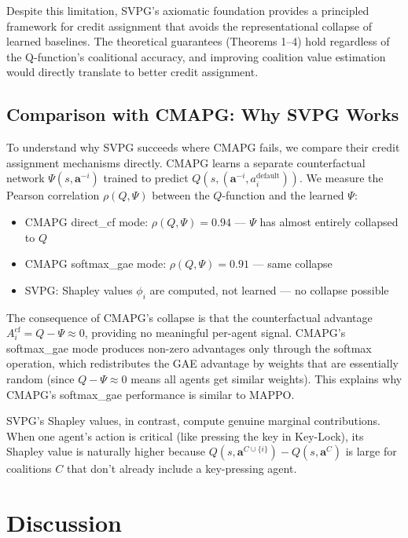 \documentclass[11pt,a4paper]{article}
\begin{document}
Despite this limitation, SVPG's axiomatic foundation provides a principled framework for credit assignment that avoids the representational collapse of learned baselines. The theoretical guarantees (Theorems 1--4) hold regardless of the Q-function's coalitional accuracy, and improving coalition value estimation would directly translate to better credit assignment.

\subsection{Comparison with CMAPG: Why SVPG Works}

To understand why SVPG succeeds where CMAPG fails, we compare their credit assignment mechanisms directly. CMAPG learns a separate counterfactual network $\Psi(s, \mathbf{a}^{-i})$ trained to predict $Q(s, (\mathbf{a}^{-i}, a_i^{\text{default}}))$. We measure the Pearson correlation $\rho(Q, \Psi)$ between the $Q$-function and the learned $\Psi$:

\begin{itemize}[leftmargin=*]
    \item CMAPG direct\_cf mode: $\rho(Q, \Psi) = 0.94$ --- $\Psi$ has almost entirely collapsed to $Q$
    \item CMAPG softmax\_gae mode: $\rho(Q, \Psi) = 0.91$ --- same collapse
    \item SVPG: Shapley values $\phi_i$ are computed, not learned --- no collapse possible
\end{itemize}

The consequence of CMAPG's collapse is that the counterfactual advantage $A_i^{\text{cf}} = Q - \Psi \approx 0$, providing no meaningful per-agent signal. CMAPG's softmax\_gae mode produces non-zero advantages only through the softmax operation, which redistributes the GAE advantage by weights that are essentially random (since $Q - \Psi \approx 0$ means all agents get similar weights). This explains why CMAPG's softmax\_gae performance is similar to MAPPO.

SVPG's Shapley values, in contrast, compute genuine marginal contributions. When one agent's action is critical (like pressing the key in Key-Lock), its Shapley value is naturally higher because $Q(s, \mathbf{a}^{C \cup \{i\}}) - Q(s, \mathbf{a}^C)$ is large for coalitions $C$ that don't already include a key-pressing agent.

\section{Discussion}
\end{document}
